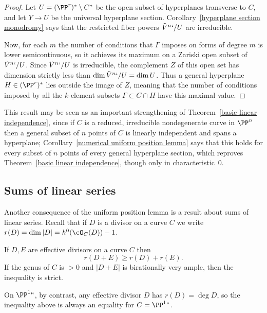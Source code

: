 \begin{proof} Let $U = (\PP^r)^* \setminus C^*$ be the open subset
of hyperplanes transverse to $C$, and let $Y\to U$ be the universal
hyperplane section.
Corollary~\ref{hyperplane section monodromy} says that the restricted
fiber powers $\tilde V^n`/U$ are irreducible.

Now, for each $m$ the number of conditions that $\Gamma$ imposes on
forms of degree $m$ is lower semicontinuous, so it achieves its maximum
on a Zariski open subset of $\tilde V^n`/U$. Since $\tilde V^n`/U$ is
irreducible, the complement $Z$ of this open set has dimension strictly
less than $\dim \tilde V^n`/U = \dim U$. Thus a general hyperplane $H
\in (\PP^r)^*$  lies outside the image of $Z$, meaning that the number
of conditions imposed by all the $k$-element subsets $\Gamma \subset C
\cap H$ have this maximal value.
\end{proof}

This result may be seen as an important strengthening of
Theorem~\ref{basic linear independence}, since if $C$ is a reduced,
irreducible nondegenerate curve in $\PP^n$ then a general subset
of $n$ points of $C$ is linearly independent and spans a hyperplane;
Corollary~\ref{numerical uniform position lemma} says that this
holds
for every subset of $n$ points of every general hyperplane section,
which reproves Theorem~\ref{basic linear independence}, though only in
characteristic~0.

\subsection*{Sums of linear series}

Another consequence of the uniform position lemma is a result about sums
%
of linear series.
Recall that if $D$ is a divisor on a curve $C$ we write $r(D) = \dim |D|
= h^0(\cO_C(D))-1$.

\begin{corollary}\label{Clifford equality plus}
If $D,E$ are effective divisors on a curve $C$ then
$$
r(D+E) \geq r(D)+r(E).
$$
If the genus of $C$ is $>0$ and $|D+E|$ is
birationally very ample,
%
%
then the inequality is strict.
\end{corollary}

On $\PP^1` `$, by contrast, any effective divisor $D$ has $r(D) = \deg
D$, so the inequality above is
always an equality for $C = \PP^1` `$.

